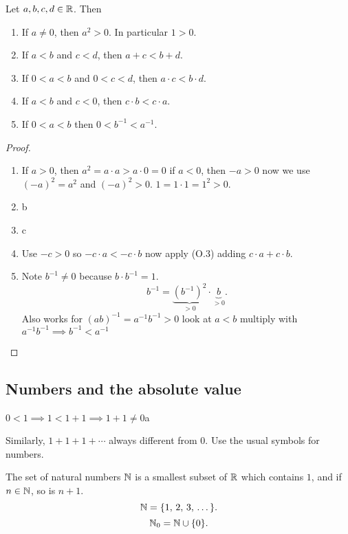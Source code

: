 \documentclass[10pt, a4paper]{article}
\begin{document}
\begin{proposition}\label{prop_anly_prop1}
    Let $a, b, c, d \in \mathbb{R}$. Then
    \begin{enumerate}[label = (\alph*)]
        \item If $a \neq 0$, then $a ^ 2 > 0$. In particular $1 > 0$.
        \item If $a < b$ and $c < d$, then $a + c < b + d$.
        \item If $0 < a < b$ and $0 < c < d$, then $a \cdot c < b \cdot d$.
        \item If $a < b$ and $c < 0$, then $c \cdot b < c \cdot a$.
        \item If $0 < a < b$ then $0 < b ^ {-1} < a ^ {-1}$.
    \end{enumerate}

    \begin{proof}\phantom{}
        \begin{enumerate}[label = (\alph*)]
            \item If $a > 0$, then $a ^ 2 = a \cdot a > a \cdot 0 = 0$
            if $a < 0$, then $-a > 0$ now we use $(-a) ^ 2 = a ^ 2$ and $(-a) ^ 2 > 0$. $1 = 1 \cdot 1 = 1 ^ 2 > 0$.

            \item b
            \item c
            \item Use $-c > 0$ so $-c \cdot a < -c \cdot b$ now apply (O.3) adding $c \cdot a + c \cdot b$.
            \item Note $b ^ {-1} \neq 0$ because $b \cdot b ^ {-1} = 1$.
            \[
            b ^ {-1} = \underbrace{(b ^ {-1}) ^ 2}_{> 0} \cdot \underbrace{b}_{> 0}.
            \]
            Also works for $(ab) ^ {-1} = a^{-1}b ^ {-1} > 0$ look at $a < b$ multiply with $a ^ {-1} b ^ {-1} \implies b ^ {-1} < a ^ {-1}$
        \end{enumerate}
    \end{proof}
\end{proposition}

\subsection{Numbers and the absolute value}
$0 < 1 \implies 1 < 1 + 1 \implies 1 + 1 \neq 0$a

Similarly, $1 + 1 + 1 + \dotsi$ always different from $0$. Use the usual symbols for numbers.

\begin{definition}
    The set of natural numbers $\mathbb{N}$ is a smallest subset of $\mathbb{R}$ which contains $1$, and if $n \in \mathbb{N}$, so is $n + 1$.
    \[
    \mathbb{N} = \{1,\,2,\,3,\,\dotsc\}.
    \]
    \[
    \mathbb{N}_0 = \mathbb{N} \cup \{0\}.
    \]
\end{definition}
\end{document}
